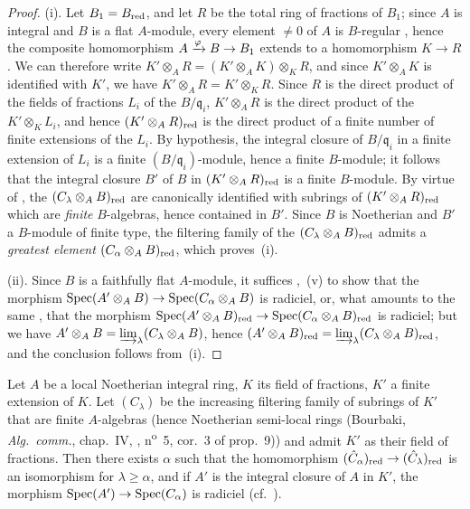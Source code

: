 \begin{proof}
\medskip\noindent
(i).
Let $B_1=B_{\mathrm{red}}$, and let $R$ be the total ring of fractions of $B_1$; since $A$ is integral and $B$ is a flat $A$-module, every element $\neq 0$ of $A$ is $B$-regular , hence the composite homomorphism $A\xrightarrow{\varphi}B\to B_1$ extends to a homomorphism $K\to R$. We can therefore write $K'\otimes_A R=(K'\otimes_A K)\otimes_K R$, and since $K'\otimes_A K$ is identified with $K'$, we have $K'\otimes_A R=K'\otimes_K R$. Since $R$ is the direct product of the fields of fractions $L_i$ of the $B/\mathfrak{q}_i$, $K'\otimes_A R$ is the direct product of the $K'\otimes_K L_i$, and hence $(K'\otimes_A R)_{\mathrm{red}}$ is the direct product of a finite number of finite extensions of the $L_i$. By hypothesis, the integral closure of $B/\mathfrak{q}_i$ in a finite extension of $L_i$ is a finite $(B/\mathfrak{q}_i)$-module, hence a finite $B$-module; it follows that the integral closure $B'$ of $B$ in $(K'\otimes_A R)_{\mathrm{red}}$ is a finite $B$-module.
By virtue of , the $(C_\lambda\otimes_A B)_{\mathrm{red}}$ are canonically identified with subrings of $(K'\otimes_A R)_{\mathrm{red}}$ which are \emph{finite} $B$-algebras, hence contained in $B'$.
Since $B$ is Noetherian and $B'$ a $B$-module of finite type, the filtering family of the $(C_\lambda\otimes_A B)_{\mathrm{red}}$ admits a \emph{greatest element} $(C_\alpha\otimes_A B)_{\mathrm{red}}$, which proves~(i).

\medskip\noindent
(ii).
Since $B$ is a faithfully flat $A$-module, it suffices ,~(v) to show that the morphism $\operatorname{Spec}(A'\otimes_A B)\to\operatorname{Spec}(C_\alpha\otimes_A B)$ is radiciel, or, what amounts to the same , that the morphism $\operatorname{Spec}(A'\otimes_A B)_{\mathrm{red}}\to\operatorname{Spec}(C_\alpha\otimes_A B)_{\mathrm{red}}$ is radiciel; but we have $A'\otimes_A B=\varinjlim_\lambda(C_\lambda\otimes_A B)$, hence  $(A'\otimes_A B)_{\mathrm{red}}=\varinjlim_\lambda(C_\lambda\otimes_A B)_{\mathrm{red}}$, and the conclusion follows from~(i).
\end{proof}

\begin{corollary}[23.2.5]
\label{0.23.2.5}
Let $A$ be a local Noetherian integral ring, $K$ its field of fractions, $K'$ a finite extension of $K$.
Let $(C_\lambda)$ be the increasing filtering family of subrings of $K'$ that are finite $A$-algebras \textup{(hence Noetherian semi-local rings (Bourbaki, \emph{Alg.~comm.}, chap.~IV, , n\textsuperscript{o}~5, cor.~3 of prop.~9))} and admit $K'$ as their field of fractions.
Then there exists $\alpha$ such that the homomorphism $(\hat{C}_\alpha)_{\mathrm{red}}\to(\hat{C}_\lambda)_{\mathrm{red}}$ is an isomorphism for $\lambda\geq\alpha$, and if $A'$ is the integral closure of $A$ in $K'$, the morphism $\operatorname{Spec}(A')\to\operatorname{Spec}(C_\alpha)$ is radiciel \textnormal{(cf.~)}.
\end{corollary}

